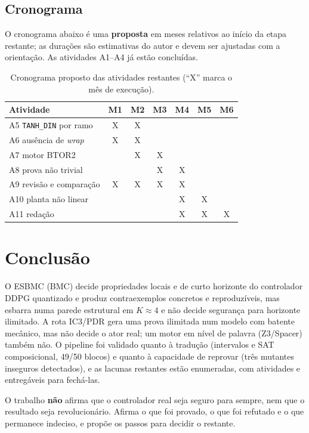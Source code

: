 \section{Cronograma}

O cronograma abaixo é uma \textbf{proposta} em meses relativos ao início da etapa restante; as durações são estimativas do autor e devem ser ajustadas com a orientação. As atividades A1--A4 já estão concluídas.

\begin{table}[htb]
\caption{Cronograma proposto das atividades restantes (``X'' marca o mês de execução).}\label{tab:crono}
\centering
\begin{tabular}{l|c|c|c|c|c|c}
\toprule
\textbf{Atividade} & \textbf{M1} & \textbf{M2} & \textbf{M3} & \textbf{M4} & \textbf{M5} & \textbf{M6} \\
\midrule
A5 \texttt{TANH\_DIN} por ramo  & X & X &   &   &   &   \\
A6 ausência de \emph{wrap}      & X & X &   &   &   &   \\
A7 motor BTOR2                  &   & X & X &   &   &   \\
A8 prova não trivial            &   &   & X & X &   &   \\
A9 revisão e comparação         & X & X & X & X &   &   \\
A10 planta não linear           &   &   &   & X & X &   \\
A11 redação                     &   &   &   & X & X & X \\
\bottomrule
\end{tabular}
\end{table}

\chapter{Conclusão}\label{cap:concl}

O ESBMC (BMC) decide propriedades locais e de curto horizonte do controlador DDPG quantizado e produz contraexemplos concretos e reproduzíveis, mas esbarra numa parede estrutural em $K\approx4$ e não decide segurança para horizonte ilimitado. A rota IC3/PDR gera uma prova ilimitada num modelo com batente mecânico, mas não decide o ator real; um motor em nível de palavra (Z3/Spacer) também não. O pipeline foi validado quanto à tradução (intervalos e SAT composicional, 49/50 blocos) e quanto à capacidade de reprovar (três mutantes inseguros detectados), e as lacunas restantes estão enumeradas, com atividades e entregáveis para fechá-las.

O trabalho \textbf{não} afirma que o controlador real seja seguro para sempre, nem que o resultado seja revolucionário. Afirma o que foi provado, o que foi refutado e o que permanece indeciso, e propõe os passos para decidir o restante.
